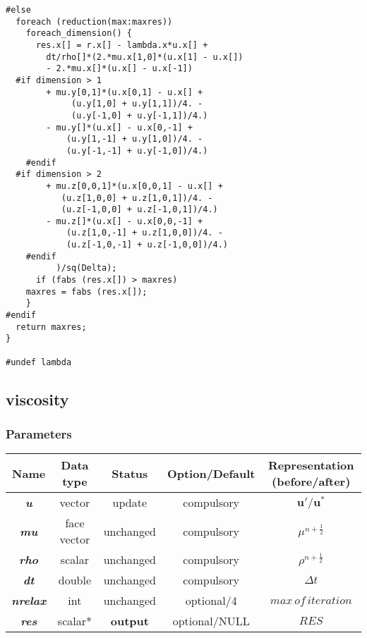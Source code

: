 \documentclass[a4paper]{article}
\newcommand{\func}[1]{\textbf{\textcolor{function}{#1}}}
\newcommand{\para}[1]{\textbf{\emph{\textcolor{para}{#1}}}}
\begin{document}
\begin{multicols}{2}
  \columnbreak
  \begin{verbatim}
#else
  foreach (reduction(max:maxres))
    foreach_dimension() {
      res.x[] = r.x[] - lambda.x*u.x[] +
        dt/rho[]*(2.*mu.x[1,0]*(u.x[1] - u.x[])
        - 2.*mu.x[]*(u.x[] - u.x[-1])
  #if dimension > 1
        + mu.y[0,1]*(u.x[0,1] - u.x[] +
             (u.y[1,0] + u.y[1,1])/4. -
             (u.y[-1,0] + u.y[-1,1])/4.)
        - mu.y[]*(u.x[] - u.x[0,-1] +
            (u.y[1,-1] + u.y[1,0])/4. -
            (u.y[-1,-1] + u.y[-1,0])/4.)
	#endif
  #if dimension > 2
        + mu.z[0,0,1]*(u.x[0,0,1] - u.x[] +
           (u.z[1,0,0] + u.z[1,0,1])/4. -
           (u.z[-1,0,0] + u.z[-1,0,1])/4.)
        - mu.z[]*(u.x[] - u.x[0,0,-1] +
            (u.z[1,0,-1] + u.z[1,0,0])/4. -
            (u.z[-1,0,-1] + u.z[-1,0,0])/4.)
	#endif
		  )/sq(Delta);
      if (fabs (res.x[]) > maxres)
	maxres = fabs (res.x[]);
    }
#endif
  return maxres;
}

#undef lambda
  \end{verbatim}
\end{multicols}

\subsection{\func{viscosity}}
\subsubsection{Parameters}
\begin{center}
  \begin{tabular}{|c|c|c|c|c|}
    \hline
    Name & Data type & Status & Option/Default & Representation (before/after)\\[0.5ex]
    \hline\hline
    \rowcolor{output}\para{u} & vector & update & compulsory & $ \mathbf{u}'/ \mathbf{u}^*$\\
    \hline
    \para{mu} & face vector & unchanged & compulsory & $ \mu^{n+ \frac{1}{2}}$\\
    \hline
    \para{rho} & scalar & unchanged & compulsory & $\rho^{n+ \frac{1}{2}}$\\
    \hline
    \para{dt} & double & unchanged & compulsory & $\Delta t$ \\
    \hline
    \para{nrelax} & int & unchanged & optional/4 & $ max\, of \, iteration$ \\
    \hline
    \rowcolor{output}\para{res} & scalar* & \textbf{output} & optional/NULL & $RES$ \\
    \hline
  \end{tabular}
\end{center}
\end{document}

